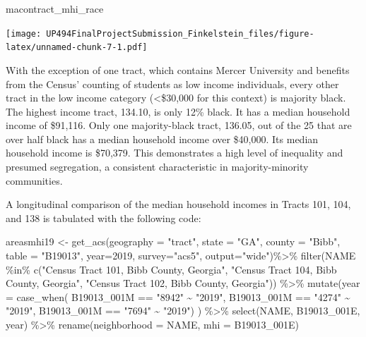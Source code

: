 \documentclass[
]{article}
\newenvironment{Shaded}{\begin{snugshade}}{\end{snugshade}}
\newcommand{\AttributeTok}[1]{\textcolor[rgb]{0.77,0.63,0.00}{#1}}
\newcommand{\DecValTok}[1]{\textcolor[rgb]{0.00,0.00,0.81}{#1}}
\newcommand{\FunctionTok}[1]{\textcolor[rgb]{0.00,0.00,0.00}{#1}}
\newcommand{\NormalTok}[1]{#1}
\newcommand{\OtherTok}[1]{\textcolor[rgb]{0.56,0.35,0.01}{#1}}
\newcommand{\SpecialCharTok}[1]{\textcolor[rgb]{0.00,0.00,0.00}{#1}}
\newcommand{\StringTok}[1]{\textcolor[rgb]{0.31,0.60,0.02}{#1}}
\begin{document}
\begin{Shaded}
\begin{Highlighting}[]
\NormalTok{macontract\_mhi\_race}
\end{Highlighting}
\end{Shaded}

\texttt{[image: UP494FinalProjectSubmission\_Finkelstein\_files/figure-latex/unnamed-chunk-7-1.pdf]}

With the exception of one tract, which contains Mercer University and
benefits from the Census' counting of students as low income
individuals, every other tract in the low income category
(\textless\$30,000 for this context) is majority black. The highest
income tract, 134.10, is only 12\% black. It has a median household
income of \$91,116. Only one majority-black tract, 136.05, out of the 25
that are over half black has a median household income over \$40,000.
Its median household income is \$70,379. This demonstrates a high level
of inequality and presumed segregation, a consistent characteristic in
majority-minority communities.

A longitudinal comparison of the median household incomes in Tracts 101,
104, and 138 is tabulated with the following code:

\begin{Shaded}
\begin{Highlighting}[]
\NormalTok{areasmhi19 }\OtherTok{\textless{}{-}} \FunctionTok{get\_acs}\NormalTok{(}\AttributeTok{geography =} \StringTok{"tract"}\NormalTok{, }\AttributeTok{state =} \StringTok{"GA"}\NormalTok{, }\AttributeTok{county =} \StringTok{"Bibb"}\NormalTok{, }\AttributeTok{table =} \StringTok{"B19013"}\NormalTok{, }\AttributeTok{year=}\DecValTok{2019}\NormalTok{, }\AttributeTok{survey=}\StringTok{"acs5"}\NormalTok{, }\AttributeTok{output=}\StringTok{"wide"}\NormalTok{)}\SpecialCharTok{\%\textgreater{}\%}
\FunctionTok{filter}\NormalTok{(NAME }\SpecialCharTok{\%in\%} \FunctionTok{c}\NormalTok{(}\StringTok{"Census Tract 101, Bibb County, Georgia"}\NormalTok{, }\StringTok{"Census Tract 104, Bibb County, Georgia"}\NormalTok{, }\StringTok{"Census Tract 102, Bibb County, Georgia"}\NormalTok{)) }\SpecialCharTok{\%\textgreater{}\%}
\FunctionTok{mutate}\NormalTok{(}\AttributeTok{year =} \FunctionTok{case\_when}\NormalTok{(}
\NormalTok{  B19013\_001M }\SpecialCharTok{==} \StringTok{"8942"} \SpecialCharTok{\textasciitilde{}} \StringTok{"2019"}\NormalTok{,}
\NormalTok{  B19013\_001M }\SpecialCharTok{==} \StringTok{"4274"} \SpecialCharTok{\textasciitilde{}} \StringTok{"2019"}\NormalTok{,}
\NormalTok{  B19013\_001M }\SpecialCharTok{==} \StringTok{"7694"} \SpecialCharTok{\textasciitilde{}} \StringTok{"2019"}\NormalTok{) ) }\SpecialCharTok{\%\textgreater{}\%}
\FunctionTok{select}\NormalTok{(NAME, B19013\_001E, year) }\SpecialCharTok{\%\textgreater{}\%}
\FunctionTok{rename}\NormalTok{(}\AttributeTok{neighborhood =}\NormalTok{ NAME, }\AttributeTok{mhi =}\NormalTok{ B19013\_001E) }
\end{Highlighting}
\end{Shaded}
\end{document}

